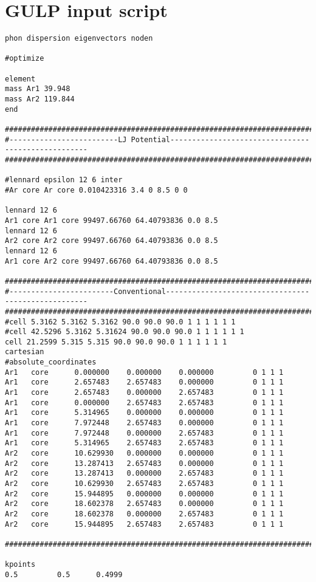 \chapter{GULP input script}

\begin{singlespace}
\begin{verbatim}
phon dispersion eigenvectors noden 

#optimize

element 
mass Ar1 39.948 
mass Ar2 119.844 
end

#########################################################################################
#-------------------------LJ Potential---------------------------------------------------
#########################################################################################

#lennard epsilon 12 6 inter
#Ar core Ar core 0.010423316 3.4 0 8.5 0 0

lennard 12 6 
Ar1 core Ar1 core 99497.66760 64.40793836 0.0 8.5
lennard 12 6 
Ar2 core Ar2 core 99497.66760 64.40793836 0.0 8.5
lennard 12 6 
Ar1 core Ar2 core 99497.66760 64.40793836 0.0 8.5

#########################################################################################
#------------------------Conventional----------------------------------------------------
#########################################################################################
#cell 5.3162 5.3162 5.3162 90.0 90.0 90.0 1 1 1 1 1 1
#cell 42.5296 5.3162 5.31624 90.0 90.0 90.0 1 1 1 1 1 1
cell 21.2599 5.315 5.315 90.0 90.0 90.0 1 1 1 1 1 1
cartesian
#absolute_coordinates
Ar1   core     	0.000000	0.000000	0.000000	     0 1 1 1 
Ar1   core     	2.657483	2.657483	0.000000	     0 1 1 1 
Ar1   core     	2.657483	0.000000	2.657483	     0 1 1 1 
Ar1   core     	0.000000	2.657483	2.657483	     0 1 1 1 
Ar1   core     	5.314965	0.000000	0.000000	     0 1 1 1 
Ar1   core     	7.972448	2.657483	0.000000	     0 1 1 1 
Ar1   core     	7.972448	0.000000	2.657483	     0 1 1 1 
Ar1   core     	5.314965	2.657483	2.657483	     0 1 1 1 
Ar2   core    	10.629930	0.000000	0.000000	     0 1 1 1 
Ar2   core    	13.287413	2.657483	0.000000	     0 1 1 1 
Ar2   core    	13.287413	0.000000	2.657483	     0 1 1 1 
Ar2   core    	10.629930	2.657483	2.657483	     0 1 1 1 
Ar2   core    	15.944895	0.000000	0.000000	     0 1 1 1 
Ar2   core    	18.602378	2.657483	0.000000	     0 1 1 1 
Ar2   core    	18.602378	0.000000	2.657483	     0 1 1 1 
Ar2   core    	15.944895	2.657483	2.657483	     0 1 1 1 

#########################################################################################

kpoints
0.5         0.5      0.4999
\end{verbatim}
\end{singlespace}
